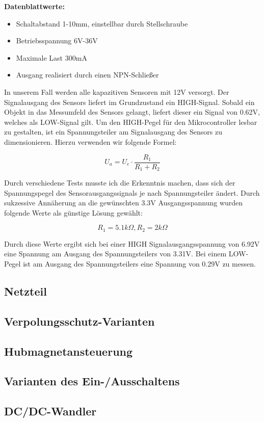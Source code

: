 \textbf{Datenblattwerte:}

\begin{itemize}
    \item Schaltabstand 1-10mm, einstellbar durch Stellschraube
    \item Betriebsspannung 6V-36V
    \item Maximale Last 300mA
    \item Ausgang realisiert durch einen NPN-Schließer
\end{itemize}



In unserem Fall werden alle kapazitiven Sensoren mit 12V versorgt. Der Signalausgang des Sensors liefert im Grundzustand ein HIGH-Signal.
Sobald ein Objekt in das Messumfeld des Sensors gelangt, liefert dieser ein Signal von 0.62V, welches als LOW-Signal gilt.
Um den HIGH-Pegel für den Mikrocontroller lesbar zu gestalten, ist ein Spannungsteiler am Signalausgang des Sensors zu dimensionieren. Hierzu verwenden wir folgende Formel:

\begin{equation}
    U_a = U_e \cdot \frac{R_1}{R_1 + R_2}
\end{equation}


Durch verschiedene Tests musste ich die Erkenntnis machen, dass sich der Spannungspegel des Sensorausgangssignals je nach Spannungsteiler ändert.
Durch sukzessive Annäherung an die gewünschten 3.3V Ausgangsspannung wurden folgende Werte als günstige Lösung gewählt:

\begin{equation*}
    R_1 = 5.1k\Omega, R_2 = 2k\Omega
\end{equation*}

Durch diese Werte ergibt sich bei einer HIGH Signalausgangsspannung von 6.92V eine Spannung am Ausgang des Spannungsteilers von 3.31V.
Bei einem LOW-Pegel ist am Ausgang des Spannungsteilers eine Spannung von 0.29V zu messen.


\subsection{Netzteil}

\subsection{Verpolungsschutz-Varianten}

\subsection{Hubmagnetansteuerung}

\subsection{Varianten des Ein-/Ausschaltens}

\subsection{DC/DC-Wandler}
